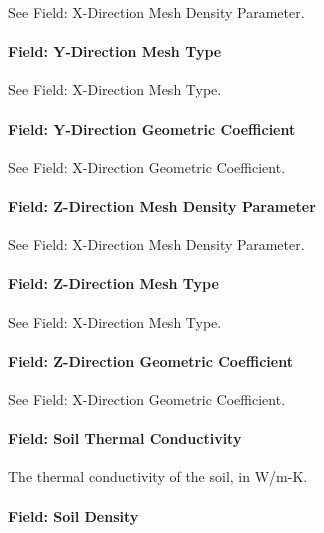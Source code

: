 See Field: X-Direction Mesh Density Parameter.

\paragraph{Field: Y-Direction Mesh Type}\label{field-y-direction-mesh-type}

See Field: X-Direction Mesh Type.

\paragraph{Field: Y-Direction Geometric Coefficient}\label{field-y-direction-geometric-coefficient}

See Field: X-Direction Geometric Coefficient.

\paragraph{Field: Z-Direction Mesh Density Parameter}\label{field-z-direction-mesh-density-parameter}

See Field: X-Direction Mesh Density Parameter.

\paragraph{Field: Z-Direction Mesh Type}\label{field-z-direction-mesh-type}

See Field: X-Direction Mesh Type.

\paragraph{Field: Z-Direction Geometric Coefficient}\label{field-z-direction-geometric-coefficient}

See Field: X-Direction Geometric Coefficient.

\paragraph{Field: Soil Thermal Conductivity}\label{field-soil-thermal-conductivity-001}

The thermal conductivity of the soil, in W/m-K.

\paragraph{Field: Soil Density}\label{field-soil-density-001}

